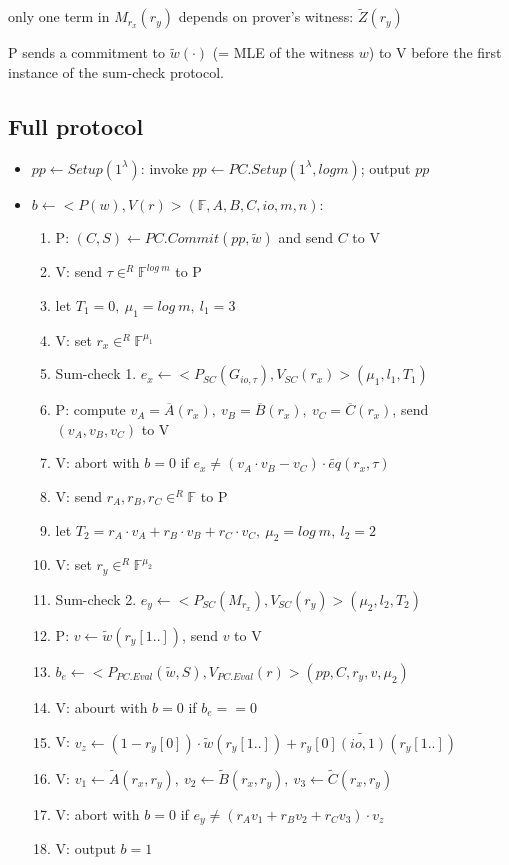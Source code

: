 \documentclass{article}
\theoremstyle{definition}
\begin{document}
only one term in $M_{r_x}(r_y)$ depends on prover's witness: $\widetilde{Z}(r_y)$

P sends a commitment to $\widetilde{w}(\cdot)$ (= MLE of the witness $w$) to V before the first instance of the sum-check protocol.


\subsection{Full protocol}

\begin{itemize}
	\item $pp \leftarrow Setup(1^{\lambda})$: invoke $pp \leftarrow PC.Setup(1^{\lambda}, log m)$; output $pp$
	\item $b \leftarrow <P(w), V(r)>(\mathbb{F}, A,B,C, io, m, n)$:
	\begin{enumerate}
		\item P: $(C, S) \leftarrow PC.Commit(pp, \widetilde{w})$ and send $C$ to V
		\item V: send $\tau \in^R \mathbb{F}^{log~m}$ to P
		\item let $T_1=0,~ \mu_1=log~m,~ l_1=3$
		\item V: set $r_x \in^R \mathbb{F}^{\mu_1}$
		\item Sum-check 1. $e_x \leftarrow <P_{SC}(G_{io,\tau}), V_{SC}(r_x)>(\mu_1, l_1, T_1)$
		\item P: compute $v_A=\overline{A}(r_x),~ v_B=\overline{B}(r_x),~ v_C=\overline{C}(r_x)$, send $(v_A, v_B, v_C)$ to V
		\item V: abort with $b=0$ if $e_x \neq (v_A \cdot v_B - v_C)\cdot \widetilde{eq}(r_x, \tau)$
		\item V: send $r_A, r_B, r_C \in^R \mathbb{F}$ to P
		\item let $T_2 = r_A \cdot v_A + r_B \cdot v_B + r_C \cdot v_C,~ \mu_2=log~m,~ l_2=2$
		\item V: set $r_y \in^R \mathbb{F}^{\mu_2}$
		\item Sum-check 2. $e_y \leftarrow <P_{SC}(M_{r_x}), V_{SC}(r_y)>(\mu_2, l_2, T_2)$
		\item P: $v \leftarrow \widetilde{w}(r_y[1..])$, send $v$ to V
		\item $b_e \leftarrow <P_{PC.Eval}(\widetilde{w}, S), V_{PC.Eval}(r)>(pp,  C, r_y, v, \mu_2)$
		\item V: abourt with $b=0$ if $b_e==0$
		\item V: $v_z \leftarrow (1 - r_y[0]) \cdot \widetilde{w}(r_y [1..]) + r_y[0] \widetilde{(io, 1)} (r_y[1..])$
		\item V: $v_1 \leftarrow \widetilde{A}(r_x, r_y),~ v_2 \leftarrow \widetilde{B}(r_x, r_y),~ v_3 \leftarrow \widetilde{C}(r_x, r_y)$
		\item V: abort with $b=0$ if $e_y \neq (r_A v_1 + r_B v_2 + r_C v_3) \cdot v_z$
		\item V: output $b=1$
	\end{enumerate}
\end{itemize}

\vspace{2cm}





\end{document}
